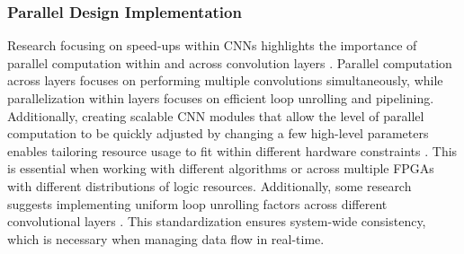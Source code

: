 \documentclass{article}
\begin{document}
        \subsubsection{Parallel Design Implementation}
        \noindent Research focusing on speed-ups within CNNs highlights the importance of parallel computation within and across convolution layers \cite{ma_scalable_2016}\cite{zhang_optimizing_2015}. Parallel computation across layers focuses on performing multiple convolutions simultaneously, while parallelization within layers focuses on efficient loop unrolling and pipelining. Additionally, creating scalable CNN modules that allow the level of parallel computation to be quickly adjusted by changing a few high-level parameters enables tailoring resource usage to fit within different hardware constraints \cite{ma_scalable_2016}. This is essential when working with different algorithms or across multiple FPGAs with different distributions of logic resources. Additionally, some research suggests implementing uniform loop unrolling factors across different convolutional layers \cite{zhang_optimizing_2015}. This standardization ensures system-wide consistency, which is necessary when managing data flow in real-time. 
        
\end{document}

